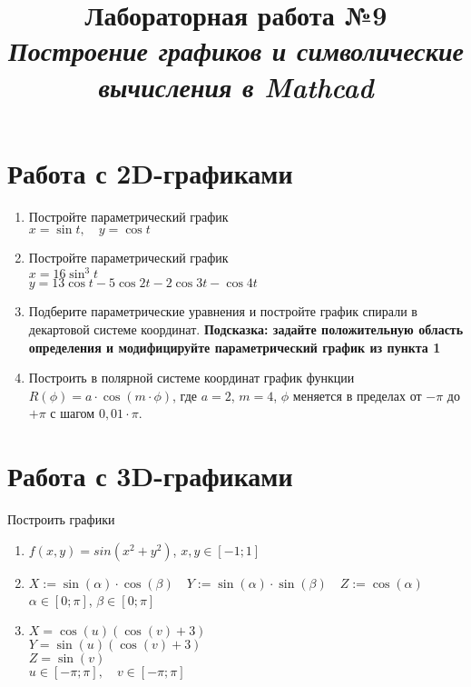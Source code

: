 \documentclass[14pt,a4paper]{article}
\title{Лабораторная работа №9 \\ \textit{Построение графиков и символические вычисления в Mathcad}}
\begin{document}
\maketitle

\progress{}
\section{Работа с 2D-графиками}
\begin{enumerate}
	\item Постройте параметрический график \\
	$x=\sin{t}, \quad y = \cos{t}$
	\item Постройте параметрический график \\
	$x=16\sin^3t$ \\
	$y=13\cos{t} - 5\cos{2t} - 2\cos{3t} - \cos{4t}$
	\item Подберите параметрические уравнения и постройте график спирали в декартовой системе координат. \textbf{Подсказка: задайте положительную область определения и модифицируйте параметрический график из пункта 1}\\
	\item Построить в полярной системе координат график функции $R(\phi) = a·\cos{(m·\phi)}$, где $a = 2$, $m = 4$, $\phi$ меняется в пределах от $-π$ до $+π$ с шагом $0,01·π$.
\end{enumerate}

\section{Работа с 3D-графиками}
\noindent Построить графики
\begin{enumerate}
	\item $f(x,y) = sin(x^2+y^2)$, $x,y \in [-1;1]$
	\item $X:=\sin \left(\alpha\right) \cdot \cos \left(\beta\right) \quad Y:=\sin \left(\alpha\right) \cdot \sin \left(\beta\right) \quad Z:=\cos \left(\alpha\right)$\\
	$\alpha \in [0;\pi]$, $\beta \in [0;\pi]$
	\item $X=\cos{(u)}(\cos{(v)}+3)$ \\
	$Y=\sin{(u)}(\cos{(v)}+3)$ \\
	$Z=\sin{(v)}$ \\
	$u\in [−\pi;\pi],\quad v \in [−\pi;\pi]$
\end{enumerate}
\end{document}
